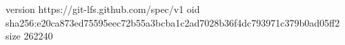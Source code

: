 version https://git-lfs.github.com/spec/v1
oid sha256:e20ca873ed75595eec72b55a3bcba1c2ad7028b36f4dc793971c379b0ad05ff2
size 262240
